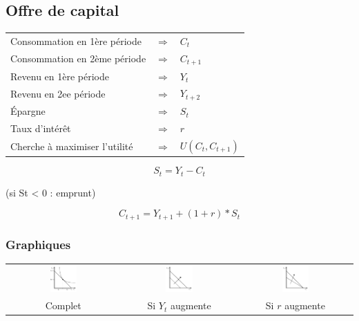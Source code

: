 \subsection{Offre de capital}



\begin{tabular}{lll}
	Consommation en 1ère période  & $\Rightarrow$ & $C_t$\\
	Consommation en 2ème période  & $\Rightarrow$ & $C_{t+1}$\\
	Revenu en 1ère période        & $\Rightarrow$ & $Y_t$\\
	Revenu en 2ee période         & $\Rightarrow$ & $Y_{t+2}$\\
	Épargne                       & $\Rightarrow$ & $S_t$\\
	Taux d'intérêt                & $\Rightarrow$ & $r$\\
	Cherche à maximiser l'utilité & $\Rightarrow$ & $U(C_t,C_{t+1})$
\end{tabular}
$$S_t = Y_t - C_t$$
\begin{flushright}
	(si St < 0 : emprunt)
\end{flushright}
$$C_{t+1} = Y_{t+1} + ( 1 + r ) * S_t $$



\subsubsection{Graphiques}



\begin{center}
	\begin{tabular}{ccc}
		\includegraphics[width=0.25\textwidth]{images/graph_offre_de_capital.pdf} & \includegraphics[width=0.25\textwidth]{images/graph_offre_de_capital_y_t_augmente.pdf} & \includegraphics[width=0.25\textwidth]{images/graph_offre_de_capital_r_augmente.pdf}\\
		Complet             &             Si $Y_t$ augmente             &             Si $r$ augmente
	\end{tabular}
\end{center}